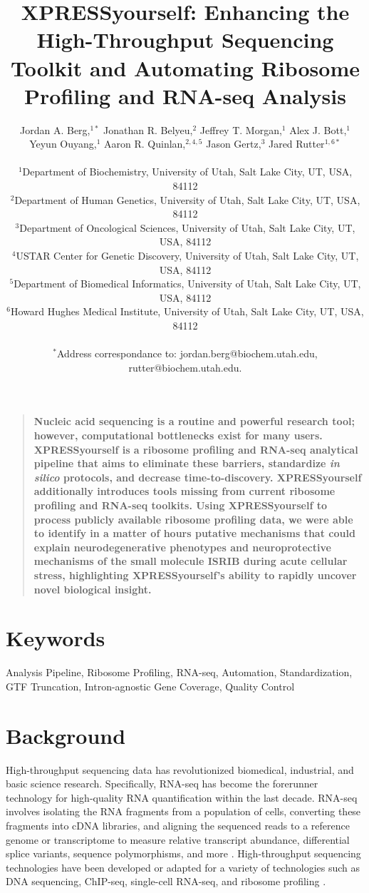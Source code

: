 \documentclass[11pt, a4paper, oneside]{article}
\title{
XPRESSyourself: Enhancing the High-Throughput Sequencing Toolkit and Automating Ribosome Profiling and RNA-seq Analysis
}
\author{
Jordan A. Berg,$^{1\ast}$ Jonathan R. Belyeu,$^{2}$ Jeffrey T. Morgan,$^{1}$ Alex J. Bott,$^{1}$ \\
Yeyun Ouyang,$^{1}$ Aaron R. Quinlan,$^{2,4,5}$ Jason Gertz,$^{3}$ Jared Rutter$^{1,6\ast}$ \\
\\
\normalsize{$^{1}$Department of Biochemistry, University of Utah, Salt Lake City, UT, USA, 84112}\\
\normalsize{$^{2}$Department of Human Genetics, University of Utah, Salt Lake City, UT, USA, 84112}\\
\normalsize{$^{3}$Department of Oncological Sciences, University of Utah, Salt Lake City, UT, USA, 84112}\\
\normalsize{$^{4}$USTAR Center for Genetic Discovery, University of Utah, Salt Lake City, UT, USA, 84112}\\
\normalsize{$^{5}$Department of Biomedical Informatics, University of Utah, Salt Lake City, UT, USA, 84112}\\
\normalsize{$^{6}$Howard Hughes Medical Institute, University of Utah, Salt Lake City, UT, USA, 84112}\\
\\
\normalsize{$^\ast$Address correspondance to: jordan.berg@biochem.utah.edu, rutter@biochem.utah.edu.}\\
}
\date{}
\newenvironment{sciabstract}{%
\begin{quote} \bf}
{\end{quote}}
\begin{document}
\baselineskip24pt

\maketitle



\begin{sciabstract}
Nucleic acid sequencing is a routine and powerful research tool; however, computational bottlenecks exist for many users. XPRESSyourself is a ribosome profiling and RNA-seq analytical pipeline that aims to eliminate these barriers, standardize \textit{in silico} protocols, and decrease time-to-discovery. XPRESSyourself additionally introduces tools missing from current ribosome profiling and RNA-seq toolkits. Using XPRESSyourself to process publicly available ribosome profiling data, we were able to identify in a matter of hours putative mechanisms that could explain neurodegenerative phenotypes and neuroprotective mechanisms of the small molecule ISRIB during acute cellular stress, highlighting XPRESSyourself's ability to rapidly uncover novel biological insight.
\end{sciabstract}

\section*{Keywords}
Analysis Pipeline, Ribosome Profiling, RNA-seq, Automation, Standardization, GTF Truncation, Intron-agnostic Gene Coverage, Quality Control

\section{Background}
High-throughput sequencing data has revolutionized biomedical, industrial, and basic science research. Specifically, RNA-seq has become the forerunner technology for high-quality RNA quantification within the last decade. RNA-seq involves isolating the RNA fragments from a population of cells, converting these fragments into cDNA libraries, and aligning the sequenced reads to a reference genome or transcriptome to measure relative transcript abundance, differential splice variants, sequence polymorphisms, and more \cite{byron_nrg}. High-throughput sequencing technologies have been developed or adapted for a variety of technologies such as DNA sequencing, ChIP-seq, single-cell RNA-seq, and ribosome profiling \cite{ingolia_science}. \par
\end{document}
